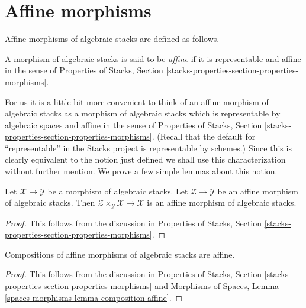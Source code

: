 \section{Affine morphisms}
\label{section-affine}

\noindent
Affine morphisms of algebraic stacks are defined as follows.

\begin{definition}
\label{definition-affine}
A morphism of algebraic stacks is said to be {\it affine}
if it is representable and affine in the sense of
Properties of Stacks, Section
\ref{stacks-properties-section-properties-morphisms}.
\end{definition}

\noindent
For us it is a little bit more convenient to think of an affine
morphism of algebraic stacks as a morphism of algebraic stacks which is
representable by algebraic spaces and affine in the sense of
Properties of Stacks, Section
\ref{stacks-properties-section-properties-morphisms}.
(Recall that the default for ``representable'' in the Stacks project
is representable by schemes.)
Since this is clearly equivalent to the notion just defined we shall
use this characterization without further mention.
We prove a few simple lemmas about this notion.

\begin{lemma}
\label{lemma-base-change-affine}
Let $\mathcal{X} \to \mathcal{Y}$ be a morphism of algebraic stacks.
Let $\mathcal{Z} \to \mathcal{Y}$ be an affine morphism of algebraic
stacks. Then $\mathcal{Z} \times_\mathcal{Y} \mathcal{X} \to \mathcal{X}$
is an affine morphism of algebraic stacks.
\end{lemma}

\begin{proof}
This follows from the discussion in
Properties of Stacks, Section
\ref{stacks-properties-section-properties-morphisms}.
\end{proof}

\begin{lemma}
\label{lemma-composition-affine}
Compositions of affine morphisms of algebraic stacks are affine.
\end{lemma}

\begin{proof}
This follows from the discussion in
Properties of Stacks, Section
\ref{stacks-properties-section-properties-morphisms}
and
Morphisms of Spaces, Lemma \ref{spaces-morphisms-lemma-composition-affine}.
\end{proof}





